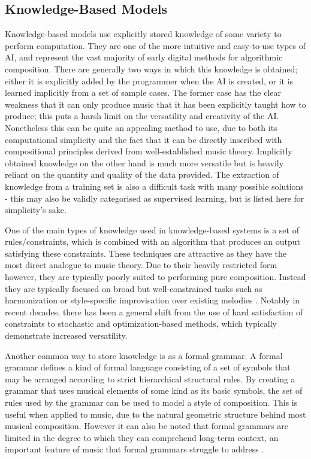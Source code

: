 \documentclass[ author={Stephen Livermore-Tozer},
				supervisor={Dr. Peter Flach},
				degree={MEng},
				title={Algorithmic Co-composition Using Machine Learning},
				subtitle={},
				type={research},
				year={2016} ]{dissertation}
\begin{document}
	\subsection{Knowledge-Based Models}
	\label{sec:knowledge-systems}
	
	Knowledge-based models use explicitly stored knowledge of some variety to perform computation. They are one of the more intuitive and easy-to-use types of AI, and represent the vast majority of early digital methods for algorithmic composition. There are generally two ways in which this knowledge is obtained; either it is explicitly added by the programmer when the AI is created, or it is learned implicitly from a set of sample cases. The former case has the clear weakness that it can only produce music that it has been explicitly taught how to produce; this puts a harsh limit on the versatility and creativity of the AI. Nonetheless this can be quite an appealing method to use, due to both its computational simplicity and the fact that it can be directly inscribed with compositional principles derived from well-established music theory. Implicitly obtained knowledge on the other hand is much more versatile but is heavily reliant on the quantity and quality of the data provided. The extraction of knowledge from a training set is also a difficult task with many possible solutions - this may also be validly categorised as supervised learning, but is listed here for simplicity's sake. 
	
	One of the main types of knowledge used in knowledge-based systems is a set of rules/constraints, which is combined with an algorithm that produces an output satisfying these constraints. These techniques are attractive as they have the most direct analogue to music theory. Due to their heavily restricted form however, they are typically poorly suited to performing pure composition. Instead they are typically focused on broad but well-constrained tasks such as harmonization \cite{thomas1985vivace} or style-specific improvisation over existing melodies \cite{horowitz1995representing}. Notably in recent decades, there has been a general shift from the use of hard satisfaction of constraints to stochastic and optimization-based methods, which typically demonstrate increased versatility.
	
	Another common way to store knowledge is as a formal grammar. A formal grammar defines a kind of formal language consisting of a set of symbols that may be arranged according to strict hierarchical structural rules. By creating a grammar that uses musical elements of some kind as its basic symbols, the set of rules used by the grammar can be used to model a style of composition. This is useful when applied to music, due to the natural geometric structure behind most musical composition. However it can also be noted that formal grammars are limited in the degree to which they can comprehend long-term context, an important feature of music that formal grammars struggle to address \cite{moorer1972music}.	 
	
\end{document}
